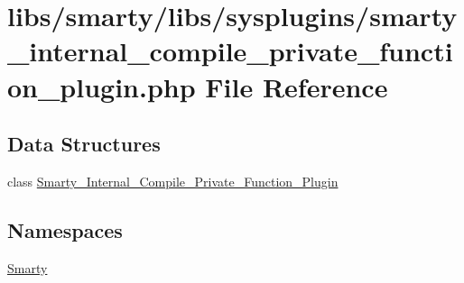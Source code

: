 \hypertarget{smarty__internal__compile__private__function__plugin_8php}{}\section{libs/smarty/libs/sysplugins/smarty\+\_\+internal\+\_\+compile\+\_\+private\+\_\+function\+\_\+plugin.php File Reference}
\label{smarty__internal__compile__private__function__plugin_8php}
\subsection*{Data Structures}
\begin{DoxyCompactItemize}
\item 
class \hyperlink{class_smarty___internal___compile___private___function___plugin}{Smarty\+\_\+\+Internal\+\_\+\+Compile\+\_\+\+Private\+\_\+\+Function\+\_\+\+Plugin}
\end{DoxyCompactItemize}
\subsection*{Namespaces}
\begin{DoxyCompactItemize}
\item 
 \hyperlink{namespace_smarty}{Smarty}
\end{DoxyCompactItemize}
